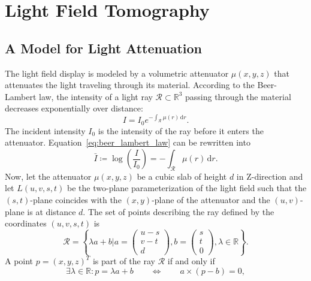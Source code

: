 \chapter{Light Field Tomography}
\label{chp:light_field_tomography}

\section{A Model for Light Attenuation}
\label{sec:light_attenuation_model}

The light field display is modeled by a volumetric attenuator $\mu(x, y, z)$ that attenuates the light traveling through its material.
According to the Beer-Lambert law, the intensity of a light ray $\mathcal{R} \subset \mathbb{R}^3$ passing through the material decreases exponentially over distance:
\begin{equation}\label{eq:beer_lambert_law}
	I = I_0 e^{-\int_\mathcal{R} \mu(r) \, \mathrm{d}r }.
\end{equation}
The incident intensity $I_0$ is the intensity of the ray before it enters the attenuator.
Equation~\ref{eq:beer_lambert_law} can be rewritten into 
\begin{equation}\label{eq:log_beer_lambert_law}
	\bar{I} \coloneqq \log \left( \frac{I}{I_0} \right) = -\int_\mathcal{R} \mu(r) \, \mathrm{d}r.
\end{equation} 
Now, let the attenuator $\mu(x, y, z)$ be a cubic slab of height $d$ in Z-direction and let $L(u, v, s, t)$ be the two-plane parameterization of the light field such that the $(s, t)$-plane coincides with the $(x, y)$-plane of the attenuator and the $(u, v)$-plane is at distance $d$.
The set of points describing the ray defined by the coordinates $(u, v, s, t)$ is
\begin{equation}
	\mathcal{R} = \left\{ \lambda a + b \mathrel{\bigg|} a = 
	\begin{pmatrix}
		u - s \\ 
		v - t \\ 
		d
	\end{pmatrix}, 
	b = 
	\begin{pmatrix}
		s \\ 
		t \\ 
		0
	\end{pmatrix},
	\lambda \in \mathbb{R} \right\}.
\end{equation}
A point $p = (x, y, z)^T$ is part of the ray $\mathcal{R}$ if and only if
\begin{equation}
	\exists \lambda \in \mathbb{R} : p = \lambda a + b 
	\qquad \iff \qquad 
	a \times (p - b) = 0, 
\end{equation} 
